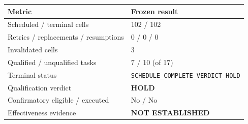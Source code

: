 \begin{tabularx}{\linewidth}{@{}lX@{}}
\toprule
\textbf{Metric} & \textbf{Frozen result} \\
\midrule
Scheduled / terminal cells & 102 / 102 \\
Retries / replacements / resumptions & 0 / 0 / 0 \\
Invalidated cells & 3 \\
Qualified / unqualified tasks & 7 / 10 (of 17) \\
Terminal status & \texttt{SCHEDULE\_\allowbreak COMPLETE\_\allowbreak VERDICT\_\allowbreak HOLD} \\
Qualification verdict & \textbf{HOLD} \\
Confirmatory eligible / executed & No / No \\
Effectiveness evidence & \textbf{NOT ESTABLISHED} \\
\bottomrule
\end{tabularx}

